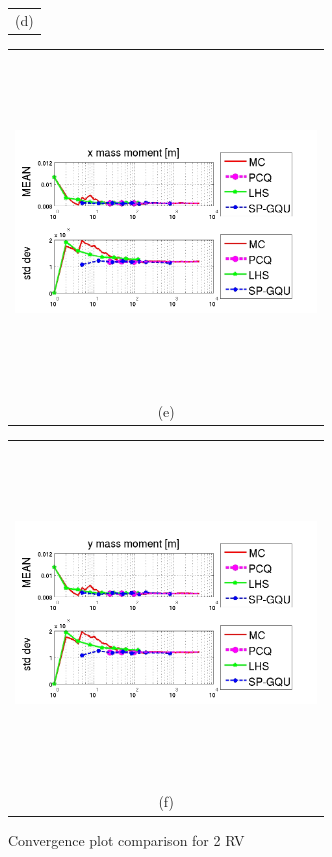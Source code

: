 \documentclass{article}
\newcommand{\Pic}[2][0.85]{\begin{center}\texttt{[image: \#2]}
 \end{center} }
\begin{document}
\begin{figure}[H]
\begin{minipage}[c]{0.6\textwidth}
\begin{tabular}{c}
        (d)
        \end{tabular}
    \end{minipage}    
     \begin{minipage}{0.6\textwidth}
        \begin{tabular}{c}
	\includegraphics[width=8cm,height=9cm,keepaspectratio]{fig/picsgqu/cinci_GQU.jpg}\\
        (e)
        \end{tabular}
    \end{minipage}
   \begin{minipage}[c]{0.6\textwidth}
       \begin{tabular}{c}
       \includegraphics[width=8cm,height=9cm,keepaspectratio]{fig/picsgqu/sase_GQU.jpg}\\
        (f)
        \end{tabular}
    \end{minipage}
\caption{ Convergence plot comparison for 2 RV }
\label{fig6}  
\end{figure}
\end{document}
